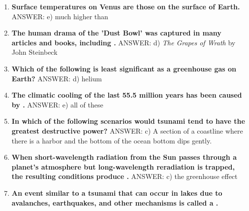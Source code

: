 \documentclass[10pt]{article}
\newcommand{\Rivpt}{\rule{.1pt}{1pt}}
\begin{document}
\begin{enumerate}
\item {
\setlength{\itemsep}{0cm}
\setlength{\parskip}{.2cm}
\begin{samepage}
\textbf{
Surface temperatures on Venus are \makebox[1cm]{\Rivpt\hrulefill\Rivpt} those on the surface of Earth.
}
ANSWER: e) much higher than
\end{samepage}
}
\item {
\setlength{\itemsep}{0cm}
\setlength{\parskip}{.2cm}
\begin{samepage}
\textbf{
The human drama of the 'Dust Bowl' was captured in many articles and books, including \makebox[1cm]{\Rivpt\hrulefill\Rivpt}.
}
ANSWER: d) \emph{The Grapes of Wrath} by John Steinbeck 
\end{samepage}
}
\item {
\setlength{\itemsep}{0cm}
\setlength{\parskip}{.2cm}
\begin{samepage}
\textbf{
Which of the following is least significant as a greenhouse gas on Earth?
}
ANSWER: d) helium
\end{samepage}
}
\item {
\setlength{\itemsep}{0cm}
\setlength{\parskip}{.2cm}
\begin{samepage}
\textbf{
The climatic cooling of the last 55.5 million years has been caused by \makebox[1cm]{\Rivpt\hrulefill\Rivpt}.
}
ANSWER: e) all of these
\end{samepage}
}
\item {
\setlength{\itemsep}{0cm}
\setlength{\parskip}{.2cm}
\begin{samepage}
\textbf{
In which of the following scenarios would tsunami tend to have the greatest destructive power?
}
ANSWER: c)	A section of a coastline where there is a harbor and the bottom of the ocean bottom dips gently.
\end{samepage}
}
\item {
\setlength{\itemsep}{0cm}
\setlength{\parskip}{.2cm}
\begin{samepage}
\textbf{
When short-wavelength radiation from the Sun passes through a planet's atmosphere but long-wavelength reradiation is trapped, the resulting conditions produce \makebox[1cm]{\Rivpt\hrulefill\Rivpt}.
}
ANSWER: c) the greenhouse effect 
\end{samepage}
}
\item {
\setlength{\itemsep}{0cm}
\setlength{\parskip}{.2cm}
\begin{samepage}
\textbf{
An event similar to a tsunami that can occur in lakes due to avalanches, earthquakes, and other mechanisms is called a \makebox[1cm]{\Rivpt\hrulefill\Rivpt}.
}
\end{samepage}}
\end{enumerate}
\end{document}
